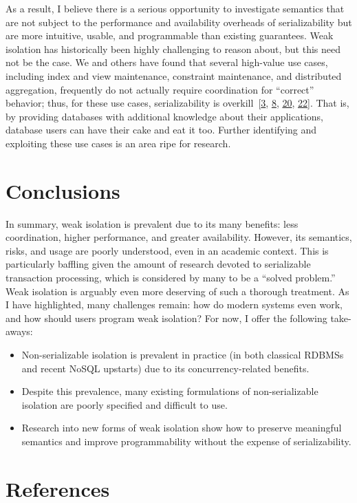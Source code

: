 \documentclass[b5paper,11pt,twoside,openright]{book}
\newcommand\Section[2]{
  \hypertarget{#1}{
    \section{#2}
  }
}
\begin{document}
As a result, I believe there is a serious opportunity to investigate
semantics that are not subject to the performance and availability
overheads of serializability but are more intuitive, usable, and
programmable than existing guarantees. Weak isolation has historically
been highly challenging to reason about, but this need not be the case.
We and others have found that several high-value use cases, including
index and view maintenance, constraint maintenance, and distributed
aggregation, frequently do not actually require coordination for
``correct'' behavior; thus, for these use cases, serializability is
overkill~{{[}\protect\hyperlink{ref-bailis-phd}{3},
  \protect\hyperlink{ref-ramp}{8},
  \protect\hyperlink{ref-homeostasis}{20},
  \protect\hyperlink{ref-crdt}{22}{]}}. That is, by providing databases
with additional knowledge about their applications, database users can
have their cake and eat it too. Further identifying and exploiting these
use cases is an area ripe for research.

\Section{conclusions}{
Conclusions
}

In summary, weak isolation is prevalent due to its many benefits: less
coordination, higher performance, and greater availability. However, its
semantics, risks, and usage are poorly understood, even in an academic
context. This is particularly baffling given the amount of research
devoted to serializable transaction processing, which is considered by
many to be a ``solved problem.'' Weak isolation is arguably even more
deserving of such a thorough treatment. As I have highlighted, many
challenges remain: how do modern systems even work, and how should users
program weak isolation? For now, I offer the following take-aways:

\begin{itemize}
  \item
  Non-serializable isolation is prevalent in practice (in both classical
  RDBMSs and recent NoSQL upstarts) due to its concurrency-related
  benefits.
  \item
  Despite this prevalence, many existing formulations of
  non-serializable isolation are poorly specified and difficult to use.
  \item
  Research into new forms of weak isolation show how to preserve
  meaningful semantics and improve programmability without the expense
  of serializability.
\end{itemize}

\section*{References}
\end{document}
